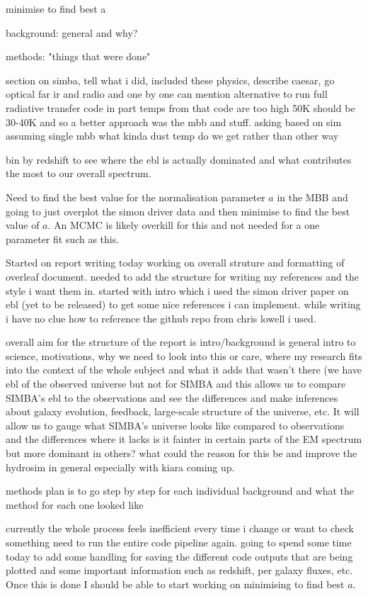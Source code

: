 \documentclass[a4paper, 11pt, oneside]{researchjournal} %
\begin{document}
minimise to find best a

background: 
general and why?

methods:
"things that were done"

section on simba, tell what i did, included these physics, describe caesar, go optical far ir and radio and one by one 
can mention alternative to run full radiative transfer code in part temps from that code are too high 50K should be 30-40K and so a better approach was the mbb and stuff. asking based on sim assuming single mbb what kinda dust temp do we get rather than other way 

bin by redshift to see where the ebl is actually dominated and what contributes the most to our overall spectrum.

Need to find the best value for the normalisation parameter $a$ in the MBB and going to just overplot the simon driver data and then minimise to find the best value of $a$. An MCMC is likely overkill for this and not needed for a one parameter fit such as this.

 Started on report writing today working on overall struture and formatting of overleaf document. needed to add the structure for writing my references and the style i want them in. started with intro which i used the simon driver paper on ebl (yet to be released) to get some nice references i can implement. while writing i have no clue how to reference the github repo from chris lowell i used. 

overall aim for the structure of the report is intro/background is general intro to science, motivations, why we need to look into this or care, where my research fits into the context of the whole subject and what it adds that wasn't there (we have ebl of the observed universe but not for SIMBA and this allows us to compare SIMBA's ebl to the observations and see the differences and make inferences about galaxy evolution, feedback, large-scale structure of the universe, etc. It will allow us to gauge what SIMBA's universe looks like compared to observations and the differences where it lacks is it fainter in certain parts of the EM spectrum but more dominant in others? what could the reason for this be and improve the hydrosim in general especially with kiara coming up.

methods plan is to go step by step for each individual background and what the method for each one looked like 

currently the whole process feels inefficient every time i change or want to check something need to run the entire code pipeline again. going to spend some time today to add some handling for saving the different code outputs that are being plotted and some important information such as redshift, per galaxy fluxes, etc. Once this is done I should be able to start working on minimising to find best $a$.
\end{document}
